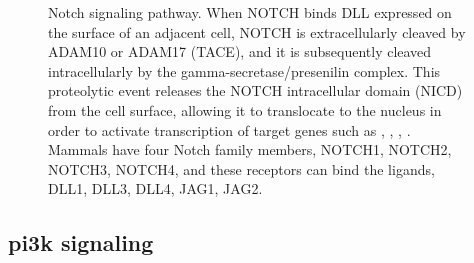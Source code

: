 


\begin{figure}[H]
	\begin{center}
	\end{center}
	\caption[Notch signaling pathway]
	{
		Notch signaling pathway.
		When NOTCH binds DLL expressed on the surface of an adjacent cell, NOTCH is extracellularly cleaved by ADAM10 or ADAM17 (TACE), and it is subsequently cleaved intracellularly by the gamma-secretase/presenilin complex. This proteolytic event releases the NOTCH intracellular domain (NICD) from the cell surface, allowing it to translocate to the nucleus in order to activate transcription of target genes such as , , , . Mammals have four Notch family members, NOTCH1, NOTCH2, NOTCH3, NOTCH4, and these receptors can bind the ligands, DLL1, DLL3, DLL4, JAG1, JAG2. 
	}
	\label{fig:notch-pathway}
\end{figure}

\subsection{\gls{pi3k} signaling}

